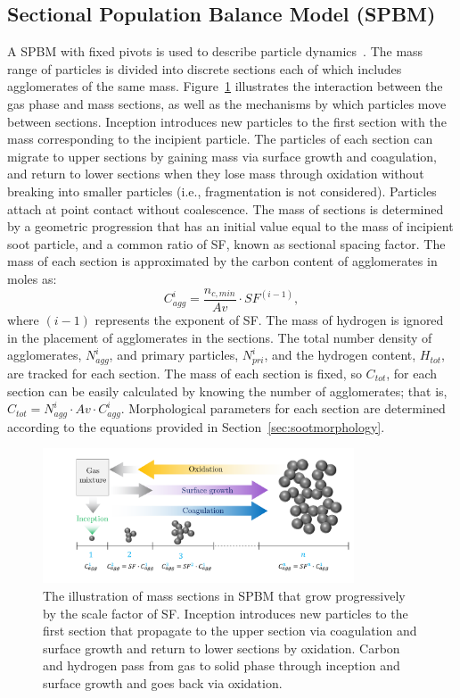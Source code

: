 \subsection{Sectional Population Balance Model (SPBM)}
A SPBM with fixed pivots is used to describe particle dynamics~\citep{wu1988discrete}. The mass range of particles is divided into discrete sections each of which includes agglomerates of the same mass. Figure~\ref{fig:sectional} illustrates the interaction between the gas phase and mass sections, as well as the mechanisms by which particles move between sections. Inception introduces new particles to the first section with the mass corresponding to the incipient particle. The particles of each section can migrate to upper sections by gaining mass via surface growth and coagulation, and return to lower sections when they lose mass through oxidation without breaking into smaller particles (i.e., fragmentation is not considered). Particles attach at point contact without coalescence. The mass of sections is determined by a geometric progression that has an initial value equal to the mass of incipient soot particle, and a common ratio of SF, known as sectional spacing factor. The mass of each section is approximated by the carbon content of agglomerates in moles as:
\begin{equation}
	C^i_{agg} = \frac{n_{c,min}}{Av}\cdot SF^{(i-1)},
	\label{eqn:Caggsec}
\end{equation}
\noindent where $(i-1)$ represents the exponent of SF. The mass of hydrogen is ignored in the placement of agglomerates in the sections.
The total number density of agglomerates, $N^i_{agg}$, and primary particles, ${N^i_{pri}}$, and the hydrogen content, $H_{tot}$, are tracked for each section. The mass of each section is fixed, so $C_{tot}$, for each section can be easily calculated by knowing the number of agglomerates; that is, $C_{tot} = N^i_{agg} \cdot {Av} \cdot C^i_{agg}$. Morphological parameters for each section are determined according to the equations provided in Section~\ref{sec:sootmorphology}.


\begin{figure}[!htbp]
	\centering
	\includegraphics[height=40mm, ]{Figures/Theory/Sectional.pdf}
	\caption{The illustration of mass sections in SPBM that grow progressively by the scale factor of SF. Inception introduces new particles to the first section that propagate to the upper section via coagulation and surface growth and return to lower sections by oxidation. Carbon and hydrogen pass from gas to solid phase through inception and surface growth and goes back via oxidation.}
	\label{fig:sectional}
\end{figure}
 
